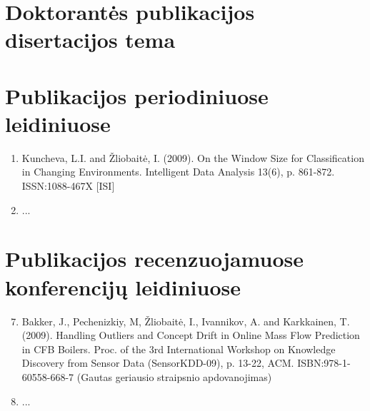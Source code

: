\section{Doktorant\.es publikacijos disertacijos tema}
\label{cha:publikacijos} 

\section*{Publikacijos periodiniuose leidiniuose}

\begin{enumerate}
\item Kuncheva, L.I. and \v{Z}liobait\.e, I. (2009). On the Window Size for Classification in Changing Environments. Intelligent Data Analysis 13(6), p. 861-872. ISSN:1088-467X  [ISI]
\item  ...
\end{enumerate}

\section*{Publikacijos recenzuojamuose konferencij\k{u} leidiniuose}

\begin{enumerate}
\setcounter{enumi}{6}
\item  Bakker, J., Pechenizkiy, M, \v{Z}liobait\.e, I., Ivannikov, A. and Karkkainen, T. (2009). Handling Outliers and Concept Drift in Online Mass Flow Prediction in CFB Boilers. Proc. of the 3rd International Workshop on Knowledge Discovery from Sensor Data (SensorKDD-09), p. 13-22, ACM. ISBN:978-1-60558-668-7 (Gautas geriausio straipsnio apdovanojimas)
\item ...
\end{enumerate}